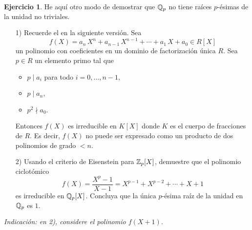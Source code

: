 \documentclass{article}
\numberwithin{equation}{section}
\theoremstyle{definition}
\newtheorem{ejerc}{Ejercicio}
\newif\ifsolutions
\begin{document}
\begin{ejerc}
  He aquí otro modo de demostrar que $\QQ_p$ no tiene raíces $p$-ésimas
  de la unidad no triviales.

  \begin{enumerate}
  \item[1)] Recuerde el  en la siguiente
    versión. Sea
    $$f (X) = a_n\,X^n + a_{n-1}\,X^{n-1} + \cdots + a_1\,X + a_0 \in R [X]$$
    un polinomio con coeficientes en un dominio de factorización única $R$. Sea
    $p\in R$ un elemento primo tal que

    \begin{itemize}
    \item $p\mid a_i$ para todo $i = 0,\ldots,n-1$,
    \item $p\mid a_n$,
    \item $p^2 \nmid a_0$.
    \end{itemize}

    Entonces $f (X)$ es irreducible en $K [X]$ donde $K$ es el cuerpo de
    fracciones de $R$. Es decir, $f (X)$ no puede ser expresado como un producto
    de dos polinomios de grado $< n$.

  \item[2)] Usando el criterio de Eisenstein para $\mathbb{Z}_p [X]$, demuestre que
    el polinomio ciclotómico
    $$f (X) = \frac{X^p - 1}{X - 1} = X^{p-1} + X^{p-2} + \cdots + X + 1$$
    es irreducible en $\QQ_p [X]$. Concluya que la única $p$-ésima raíz
    de la unidad en $\QQ_p$ es $1$.
  \end{enumerate}

  \noindent \emph{Indicación: en 2), considere el polinomio $f (X+1)$.}

  \ifsolutions\begin{solucion}
    Las $p$-ésimas raíces de la unidad son las raíces
    del polinomio
    \[ X^p - 1 = (X - 1)\,\frac{X^p - 1}{X - 1}
               = (X-1)\,(X^{p-1} + X^{p-2} + \cdots + X + 1), \]
    así que en $\QQ_p$ no hay raíces de la unidad no triviales precisamente
    cuando el polinomio
    $$f (X) = \frac{X^p - 1}{X - 1} = X^{p-1} + X^{p-2} + \cdots + X + 1$$
    es irreducible en $\QQ_p [X]$. El criterio de Eisenstein no se aplica
    a $f (X)$, pero se aplica a
    \[ f (X+1) = \frac{(X+1)^p - 1}{X}
               = \sum_{0 \le k \le p-1} {p\choose k+1}\,X^k. \]
    Efectivamente, $p\mid {p\choose k+1}$ para $k = 0,\ldots,p-2$,
    $p \nmid {p\choose p}$, y $p^2 \nmid {p\choose 1}$, así que $f (X+1)$ es
    irreducible y $f (X)$ es también irreducible.
  \end{solucion}\fi
\end{ejerc}
\end{document}
